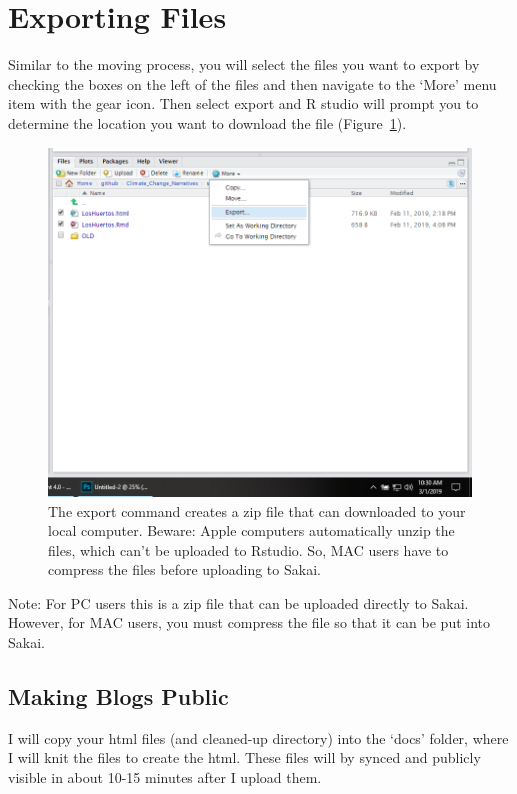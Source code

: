\documentclass{article}\usepackage[]{graphicx}\usepackage[]{color}
\begin{document}
\section{Exporting Files}

Similar to the moving process, you will select the files you want to export by checking the boxes on the left of the files and then navigate to the `More' menu item with the gear icon. Then select export and R studio will prompt you to determine the location you want to download the file (Figure~\ref{fig:export}).

\begin{figure}[h]
\includegraphics[width=\textwidth]{ExportFiles}
\caption{The export command creates a zip file that can downloaded to your local computer. Beware: Apple computers automatically unzip the files, which can't be uploaded to Rstudio. So, MAC users have to compress the files before uploading to Sakai.}
\label{fig:export}
\end{figure}

Note: For PC users this is a zip file that can be uploaded directly to Sakai. However, for MAC users, you must compress the file so that it can be put into Sakai. 

\subsection{Making Blogs Public}

I will copy your html files (and cleaned-up directory) into the `docs' folder, where I will knit the files to create the html. These files will by synced and publicly visible in about 10-15 minutes after I upload them. 
\end{document}
